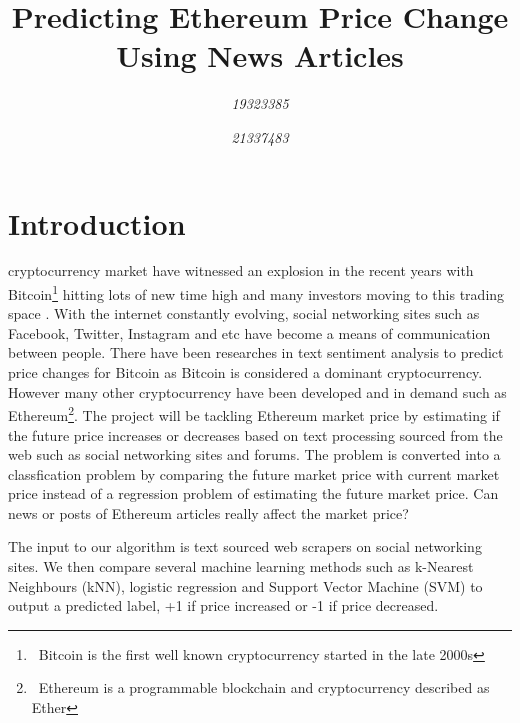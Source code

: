 \documentclass[transmag]{IEEEtran}
\begin{document}
\title{Predicting Ethereum Price Change Using News Articles}

\author{
\textit{19323385}
\and
{}
\textit{21337483}
\and
{}
}




\maketitle
\thispagestyle{plain}
\pagestyle{plain}


\section{Introduction}
 cryptocurrency market have witnessed an explosion in the recent years with Bitcoin\footnote{\ Bitcoin is the first well known cryptocurrency started in the late 2000s} hitting lots of new time high and many investors moving to this trading space \cite{huy2019predicting}. With the internet constantly evolving, social networking sites such as Facebook, Twitter, Instagram and etc have become a means of communication between people. There have been researches in text sentiment analysis to predict price changes for Bitcoin \cite{huy2019predicting}\cite{sattarov2020forecasting} as Bitcoin is considered a dominant cryptocurrency. However many other cryptocurrency have been developed and in demand such as Ethereum\footnote{\ Ethereum is a programmable blockchain and cryptocurrency described as Ether}. The project will be tackling Ethereum market price by estimating if the future price increases or decreases based on text processing sourced from the web such as social networking sites and forums. The problem is converted into a classfication problem by comparing the future market price with current market price instead of a regression problem of estimating the future market price. Can news or posts of Ethereum articles really affect the market price?

\noindent The input to our algorithm is text sourced web scrapers on social networking sites. We then compare several machine learning methods such as k-Nearest Neighbours (kNN), logistic regression and Support Vector Machine (SVM) to output a predicted label, +1 if price increased or -1 if price decreased.
\end{document}

